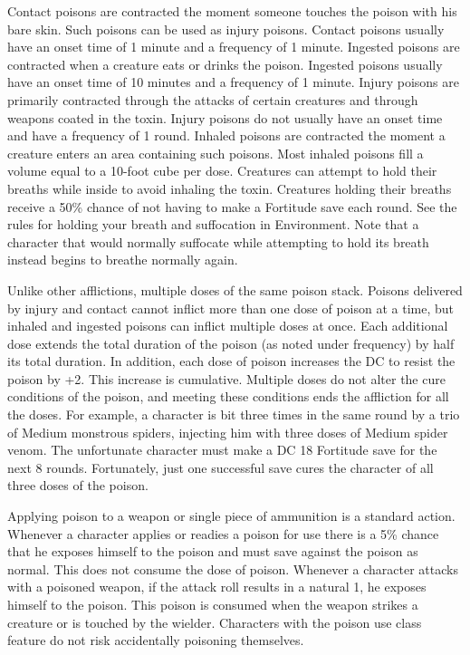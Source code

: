 Contact poisons are contracted the moment someone touches the poison with his bare skin. Such poisons can be used as injury poisons. Contact poisons usually have an onset time of 1 minute and a frequency of 1 minute. Ingested poisons are contracted when a creature eats or drinks the poison. Ingested poisons usually have an onset time of 10 minutes and a frequency of 1 minute. Injury poisons are primarily contracted through the attacks of certain creatures and through weapons coated in the toxin. Injury poisons do not usually have an onset time and have a frequency of 1 round. Inhaled poisons are contracted the moment a creature enters an area containing such poisons. Most inhaled poisons fill a volume equal to a 10-foot cube per dose. Creatures can attempt to hold their breaths while inside to avoid inhaling the toxin. Creatures holding their breaths receive a 50\% chance of not having to make a Fortitude save each round. See the rules for holding your breath and suffocation in Environment. Note that a character that would normally suffocate while attempting to hold its breath instead begins to breathe normally again.
				
Unlike other afflictions, multiple doses of the same poison stack. Poisons delivered by injury and contact cannot inflict more than one dose of poison at a time, but inhaled and ingested poisons can inflict multiple doses at once. Each additional dose extends the total duration of the poison (as noted under frequency) by half its total duration. In addition, each dose of poison increases the DC to resist the poison by +2. This increase is cumulative. Multiple doses do not alter the cure conditions of the poison, and meeting these conditions ends the affliction for all the doses. For example, a character is bit three times in the same round by a trio of Medium monstrous spiders, injecting him with three doses of Medium spider venom. The unfortunate character must make a DC 18 Fortitude save for the next 8 rounds. Fortunately, just one successful save cures the character of all three doses of the poison.
				
Applying poison to a weapon or single piece of ammunition is a standard action. Whenever a character applies or readies a poison for use there is a 5\% chance that he exposes himself to the poison and must save against the poison as normal. This does not consume the dose of poison. Whenever a character attacks with a poisoned weapon, if the attack roll results in a natural 1, he exposes himself to the poison. This poison is consumed when the weapon strikes a creature or is touched by the wielder. Characters with the poison use class feature do not risk accidentally poisoning themselves.
				
